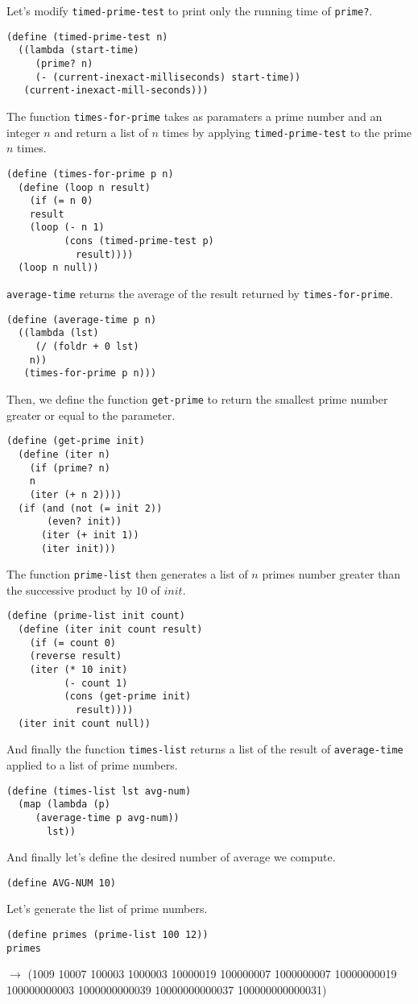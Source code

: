 \documentclass[a4paper,12pt]{article}
\begin{document}
\noindent
Let's modify \lstinline!timed-prime-test! to print only the running time
of \lstinline!prime?!.
\begin{lstlisting}
(define (timed-prime-test n)
  ((lambda (start-time)
     (prime? n)
     (- (current-inexact-milliseconds) start-time))
   (current-inexact-mill-seconds)))
\end{lstlisting}
The function \lstinline!times-for-prime! takes as paramaters a prime
number and an integer $n$ and return a list of $n$ times by applying
\lstinline!timed-prime-test! to the prime $n$ times.
\begin{lstlisting}
(define (times-for-prime p n)
  (define (loop n result)
    (if (= n 0)
	result
	(loop (- n 1)
	      (cons (timed-prime-test p)
		    result))))
  (loop n null))
\end{lstlisting}
\lstinline!average-time! returns the average of the result returned by
\lstinline!times-for-prime!.
\begin{lstlisting}
(define (average-time p n)
  ((lambda (lst)
     (/ (foldr + 0 lst)
	n))
   (times-for-prime p n)))
\end{lstlisting}
Then, we define the function \lstinline!get-prime! to return the
smallest prime number greater or equal to the parameter.
\begin{lstlisting}
(define (get-prime init)
  (define (iter n)
    (if (prime? n)
	n
	(iter (+ n 2))))
  (if (and (not (= init 2))
	   (even? init))
      (iter (+ init 1))
      (iter init)))
\end{lstlisting}
The function \lstinline!prime-list! then generates a list of $n$
primes number greater than the successive product by $10$ of $init$.
\newpage
\begin{lstlisting}
(define (prime-list init count)
  (define (iter init count result)
    (if (= count 0)
	(reverse result)
	(iter (* 10 init)
	      (- count 1)
	      (cons (get-prime init)
		    result))))
  (iter init count null))
\end{lstlisting}
And finally the function \lstinline!times-list! returns a list of the
result of \lstinline!average-time! applied to a list of prime numbers.
\begin{lstlisting}
(define (times-list lst avg-num)
  (map (lambda (p)
	 (average-time p avg-num))
       lst))
\end{lstlisting}
And finally let's define the desired number of average we compute.
\begin{lstlisting}
(define AVG-NUM 10)
\end{lstlisting}
Let's generate the list of prime numbers.
\begin{lstlisting}
(define primes (prime-list 100 12))
primes
\end{lstlisting}
$\rightarrow$ (1009
 10007
 100003
 1000003
 10000019
 100000007
 1000000007
 10000000019
 100000000003
 1000000000039
 10000000000037
 100000000000031)
\end{document}
